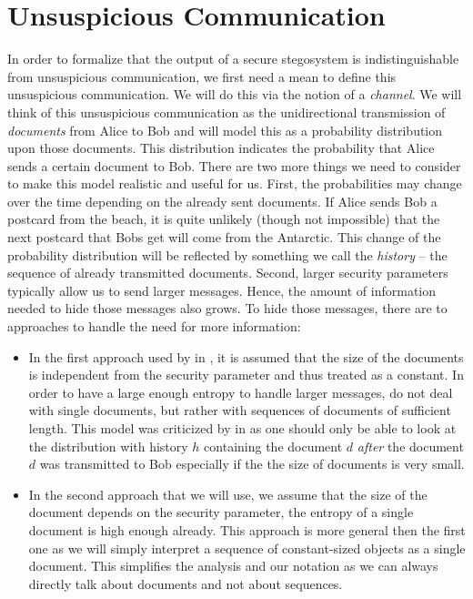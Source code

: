 \section{Unsuspicious Communication}
In order to formalize that the output of a secure stegosystem is
indistinguishable from unsuspicious communication, we first need a mean
to define this unsuspicious communication. We will do this via the
notion of a \emph{channel}. We will think of this unsuspicious
communication as the unidirectional transmission of \emph{documents}
from Alice to Bob and will model this as a probability distribution upon
those documents. This distribution indicates the probability that Alice
sends a certain document to Bob. There are two more things we need to
consider to make this model realistic and useful for us. First, the
probabilities may change over the time depending on the already sent
documents. If Alice sends Bob a postcard from the beach, it is quite
unlikely (though not impossible) that the next postcard that Bobs get
will come from the Antarctic. This change of the probability
distribution will be reflected by something we call the \emph{history}
-- the sequence of already transmitted documents. Second, larger
security parameters typically allow us to send larger messages. Hence,
the amount of information needed to hide those messages also grows. 
To hide those messages, there are to approaches to handle the need for
more information:
\begin{itemize}
\item In the first approach used by \citeauthor{hopper2009provably} in
  \cite{hopper2009provably}, it is assumed that the size of the
  documents is independent from the security parameter and thus treated
  as a constant. In order to have a large enough entropy to handle
  larger messages, \citeauthor{hopper2009provably} do not deal with
  single documents, but rather with sequences of documents of sufficient
  length. This model was criticized by
  \citeauthor{lysyanskaya2006imperfect} in
  \cite{lysyanskaya2006imperfect} as one should only be able to look at
  the distribution with history $h$ containing the document $d$
  \emph{after} the document $d$ was transmitted to Bob especially if the
  the size of documents is very small.
\item In the second approach that we will use, we assume that the size
  of the document depends on the security parameter, \ie the entropy of
  a single document is high enough already. This approach is more
  general then the first one as we will simply interpret a sequence of
  constant-sized objects as a single document. This simplifies the
  analysis and our notation as we can always directly talk about
  documents and not about sequences.
\end{itemize}

